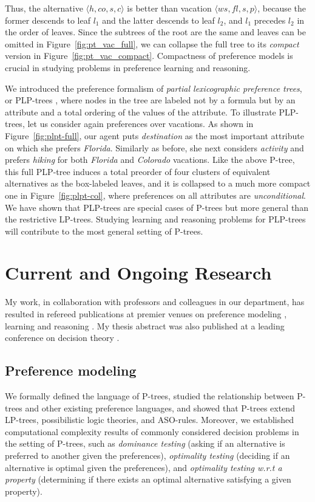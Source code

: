 \documentclass[11pt]{article}
\newcommand{\figref}[1]{Figure~\ref{fig:#1}}
\begin{document}
Thus, the alternative $\langle h, co, s, c \rangle$ is better than
vacation $\langle ws, fl, s, p\rangle$, 
because the former descends to leaf $l_1$ and the latter descends to leaf $l_2$, and $l_1$
precedes $l_2$ in the order of leaves.
Since the subtrees of the root are the same and leaves can be omitted in \figref{pt_vac_full},
we can collapse the full tree to its \textit{compact} version in \figref{pt_vac_compact}.
Compactness of preference models is
crucial in studying problems in preference learning and reasoning.

We introduced the preference formalism of \textit{partial lexicographic preference trees},
or PLP-trees \cite{LiuT:Learn_PLPTrees}, where nodes in the tree are labeled not by a formula 
but by an attribute and a total ordering of the values of the attribute.
To illustrate PLP-trees, let us consider again preferences over vacations.
As shown in \figref{plpt-full}, our agent puts \textit{destination} as the most important attribute on which
she prefers \textit{Florida}.
Similarly as before, she next considers \textit{activity} and prefers 
\textit{hiking} for both \textit{Florida} and \textit{Colorado} vacations.
Like the above P-tree, this full PLP-tree induces a total preorder of four 
clusters of equivalent alternatives as the box-labeled leaves, and it is collapsed to a
much more compact one in \figref{plpt-col}, where 
preferences on all attributes are \textit{unconditional}.
We have shown that PLP-trees are special cases of 
P-trees but more general than the restrictive LP-trees.
Studying learning and reasoning problems for PLP-trees will contribute
to the most general setting of P-trees.


\section{Current and Ongoing Research}
\noindent My work, in collaboration with professors and colleagues in our department,
has resulted in refereed publications at premier venues on preference modeling \cite{wsh/mpref14/LiuT,LiuT:PT}, learning
\cite{LiuT:Learn_PLPTrees} and reasoning \cite{LiuT:LPT_ASP_EA,LiuT:LPT_ASP,Spradling}.
My thesis abstract was also published at a leading conference on decision theory \cite{Liu:TA}.

\subsection{Preference modeling}
\noindent We formally defined the language of P-trees,
studied the relationship between P-trees and other existing preference languages, and
showed that P-trees extend  
LP-trees, possibilistic logic theories, and ASO-rules\cite{wsh/mpref14/LiuT,LiuT:PT}.
Moreover, we established computational complexity results of commonly considered decision
problems in the setting of P-trees, such as \textit{dominance testing} 
(asking if an alternative is preferred to another given the preferences),
\textit{optimality testing} (deciding if an alternative is optimal given the preferences), and
\textit{optimality testing w.r.t a property} (determining if there exists an optimal alternative
satisfying a given property).
\end{document}

